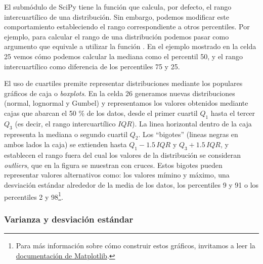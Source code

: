 El submódulo  de SciPy tiene la función  que calcula, por defecto, el rango intercuartílico de una distribución. Sin embargo, podemos modificar este comportamiento estableciendo el rango correspondiente a otros percentiles. Por ejemplo, para calcular el rango de una distribución podemos pasar como argumento  que equivale a utilizar la función . En el ejemplo mostrado en la celda 25 vemos cómo podemos calcular la mediana como el percentil 50, y el rango intercuartílico como diferencia de los percentiles 75 y 25.


El uso de cuartiles premite representar distribuciones mediante los populares gráficos de caja o \textit{boxplots}. En la celda 26 generamos nuevas distribuciones (normal, lognormal y Gumbel) y representamos los valores obtenidos mediante cajas que abarcan el 50 \% de los datos, desde el primer cuartil $Q_1$ hasta el tercer $Q_3$ (es decir, el rango intercuartílico $IQR$). La linea horizontal dentro de la caja representa la mediana o  segundo cuartil $Q_2$. Los ``bigotes'' (lineas negras en ambos lados la caja) se extienden hasta $Q_1 - 1.5 \, IQR$ y $Q_3 + 1.5 \, IQR$, y establecen el rango fuera del cual los valores de la distribución se consideran \textit{outliers}, que en la figura se muestran con cruces. Estos bigotes pueden representar valores alternativos como: los valores mímino y máximo, una desviación estándar alrededor de la media de los datos, los percentiles 9 y 91 o los percentiles 2 y 98\footnote{Para más información sobre cómo construir estos gráficos, invitamos a leer la \href{https://matplotlib.org/stable/api/\_as\_gen/matplotlib.pyplot.boxplot.html}{documentación de Matplotlib}.}.





\subsubsection{Varianza y desviación estándar}

